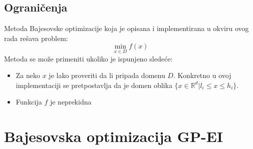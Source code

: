 ﻿\documentclass[11pt,a4paper]{article}
\begin{document}
\subsection{Ograničenja}
Metoda Bajesovske optimizacije koja je opisana i implementirana u okviru ovog rada rešava problem:
$$\min_{x \in D}f(x)$$
Metoda se može primeniti ukoliko je ispunjeno sledeće:
\begin{itemize}
  \item Za neko $x$ je lako proveriti da li pripada domenu $D$. Konkretno u ovoj implementaciji se pretpostavlja da je domen oblika $\{ x \in \mathbb{R}^d | l_i \leq x \leq h_i  \}$.
  \item Funkcija $f$ je neprekidna
\end{itemize}

\section{Bajesovska optimizacija GP-EI}
\end{document}
